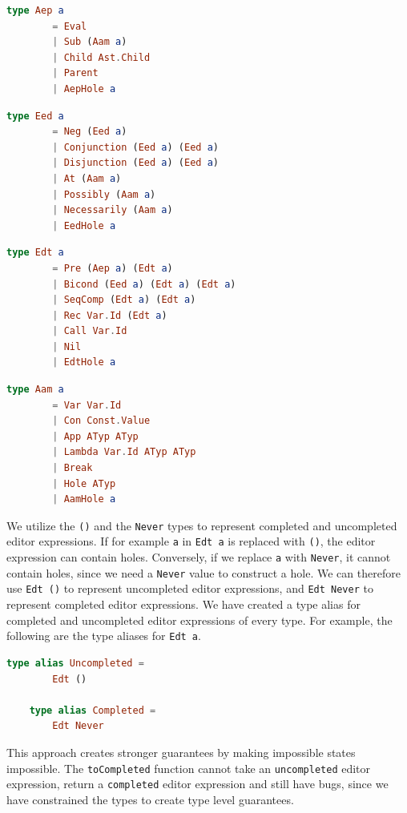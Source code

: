 \begin{lstlisting}[language=elm,%
                   label="aep-definition",%
                   gobble=4,%
                   ]
    type Aep a
        = Eval
        | Sub (Aam a)
        | Child Ast.Child
        | Parent
        | AepHole a
\end{lstlisting}

\begin{lstlisting}[language=elm,%
                   label="eed-definitions",%
                   gobble=4,%
                   ]
    type Eed a
        = Neg (Eed a)
        | Conjunction (Eed a) (Eed a)
        | Disjunction (Eed a) (Eed a)
        | At (Aam a)
        | Possibly (Aam a)
        | Necessarily (Aam a)
        | EedHole a
\end{lstlisting}

\begin{lstlisting}[language=elm,%
                   label="generic-edt-definition",%
                   gobble=4,%
                   ]
    type Edt a
        = Pre (Aep a) (Edt a)
        | Bicond (Eed a) (Edt a) (Edt a)
        | SeqComp (Edt a) (Edt a)
        | Rec Var.Id (Edt a)
        | Call Var.Id
        | Nil
        | EdtHole a
\end{lstlisting}

\begin{lstlisting}[language=elm,%
                   label="aam-definitions",%
                   gobble=4,%
                   ]
    type Aam a
        = Var Var.Id
        | Con Const.Value
        | App ATyp ATyp
        | Lambda Var.Id ATyp ATyp
        | Break
        | Hole ATyp
        | AamHole a
\end{lstlisting}

We utilize the \texttt{()} and the \texttt{Never} types to represent
completed and uncompleted editor expressions. If for example \texttt{a} in
\texttt{Edt a} is replaced with \texttt{()}, the editor expression can contain
holes. Conversely, if we replace \texttt{a} with \texttt{Never}, it cannot
contain holes, since we need a \texttt{Never} value to construct a hole. We can
therefore use \texttt{Edt ()} to represent uncompleted editor expressions, and
\texttt{Edt Never} to represent completed editor expressions. We have created a
type alias for completed and uncompleted editor expressions of every type. For
example, the following are the type aliases for \texttt{Edt a}.

\begin{lstlisting}[language=elm,%
                   label="completed-and-uncompleted-edts",%
                   gobble=4,%
                   ]
    type alias Uncompleted =
        Edt ()

    type alias Completed =
        Edt Never
\end{lstlisting}

This approach creates stronger guarantees by making impossible states
impossible. The \texttt{toCompleted} function cannot take an
\texttt{uncompleted} editor expression, return a \texttt{completed} editor
expression and still have bugs, since we have constrained the types to create
type level guarantees.



